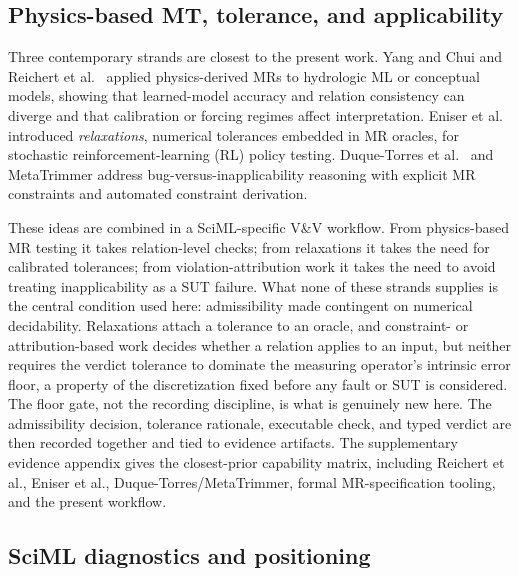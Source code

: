 \documentclass[preprint,12pt,authoryear]{elsarticle}
\begin{document}
\subsection{Physics-based MT, tolerance, and applicability}
\label{subsec:physics-mt}

Three contemporary strands are closest to the present work. Yang and Chui \citep{yang2021hydromt} and Reichert et al.~\citep{reichert2024hess} applied physics-derived MRs to hydrologic ML or conceptual models, showing that learned-model accuracy and relation consistency can diverge and that calibration or forcing regimes affect interpretation. Eniser et al.~\citep{eniser2022relaxations} introduced \emph{relaxations}, numerical tolerances embedded in MR oracles, for stochastic reinforcement-learning (RL) policy testing. Duque-Torres et al.~\citep{duqueTorres2023bugornot,duqueTorres2023completePipeline,duqueTorres2024selecting} and MetaTrimmer \citep{duqueTorres2023metaTrimmer} address bug-versus-inapplicability reasoning with explicit MR constraints and automated constraint derivation.

These ideas are combined in a SciML-specific V\&V workflow. From physics-based MR testing it takes relation-level checks; from relaxations it takes the need for calibrated tolerances; from violation-attribution work it takes the need to avoid treating inapplicability as a SUT failure. What none of these strands supplies is the central condition used here: admissibility made contingent on numerical decidability. Relaxations attach a tolerance to an oracle, and constraint- or attribution-based work decides whether a relation applies to an input, but neither requires the verdict tolerance to dominate the measuring operator's intrinsic error floor, a property of the discretization fixed before any fault or SUT is considered. The floor gate, not the recording discipline, is what is genuinely new here. The admissibility decision, tolerance rationale, executable check, and typed verdict are then recorded together and tied to evidence artifacts. The supplementary evidence appendix gives the closest-prior capability matrix, including Reichert et al., Eniser et al., Duque-Torres/MetaTrimmer, formal MR-specification tooling, and the present workflow.

\subsection{SciML diagnostics and positioning}
\label{subsec:sciml-vv}
\label{subsec:hybrid-trust}
\label{subsec:new-not-new}
\end{document}
